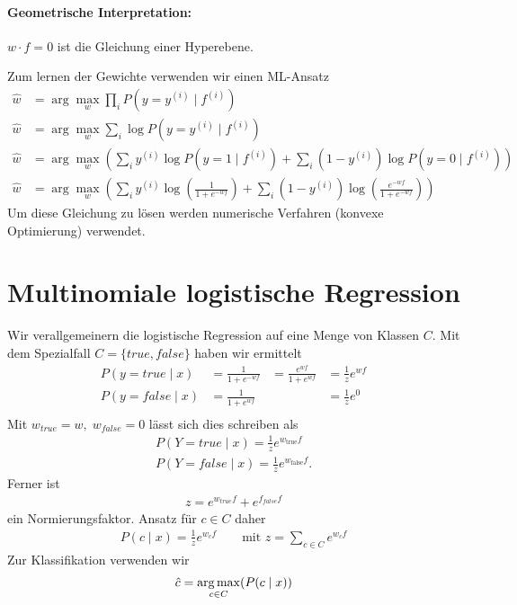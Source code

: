 \paragraph{Geometrische Interpretation:}
\label{par:geometrische_interpretation_}

$w\cdot f=0$ ist die Gleichung einer Hyperebene.

Zum lernen der Gewichte verwenden wir einen ML-Ansatz
\begin{align*}
    \hat w & = \arg\max_w \prod\limits_i P(y=y^{(i)}\mid f^{(i)})\\
    \hat w & = \arg\max_w \sum\limits_i \log P(y=y^{(i)}\mid f^{(i)})\\
    \hat w & = \arg\max_w \left(\sum\limits_i y^{(i)}\log P(y=1\mid
        f^{(i)}) + \sum\limits_i (1-y^{(i)})\log P(y=0\mid f^{(i)})\right)\\
    \hat w & = \arg\max_w \left(\sum\limits_i y^{(i)} \log
    \left(\frac{1}{1+e^{-wf}}\right)+
    \sum\limits_i (1-y^{(i)}) \log \left(\frac{e^{-wf}}{1+e^{-wf}}\right)\right)
\end{align*}
Um diese Gleichung zu lösen werden numerische Verfahren (konvexe Optimierung) verwendet.


\section{Multinomiale logistische Regression}
\label{sec:multinomiale_logistische_regression}
Wir verallgemeinern die logistische Regression auf eine Menge von Klassen $C$.
Mit dem Spezialfall \(C=\{true,false\}\) haben wir ermittelt
\begin{equation*}
	\begin{aligned}
		P(y=true\mid x) &=\frac{1}{1+e^{-wf}}	&=\frac{e^{wf}}{1+e^{wf}} 	&=\frac{1}{z}e^{wf}\\
		P(y=false\mid x)&=\frac{1}{1+e^{wf}} 	&							&=\frac{1}{z}e^{0}\\
	\end{aligned}
\end{equation*}
Mit $w_{true} = w,\; w_{false}=0$ lässt sich dies schreiben als
\begin{align*}
    P(Y=true\mid x)=\frac{1}{z}e^{w_{\text{true}}f}\\
    P(Y=false\mid x)=\frac{1}{z}e^{w_{\text{false}}f}.
\end{align*}
Ferner ist
\begin{align*}
    z=e^{w_{true}f}+e^{f_{false}f}
\end{align*}
ein Normierungsfaktor.
Ansatz für $c\in C$ daher
\begin{align*}
    P(c\mid x)=\frac{1}{z}e^{w_cf} \qquad \text{mit } z=\sum\limits_{c\in
        C}e^{w_cf}
\end{align*}
Zur Klassifikation verwenden wir
\begin{align*}
    \hat c =\operatorname*{arg\,max}_{c\in C}(P(c\mid x))
\end{align*}


